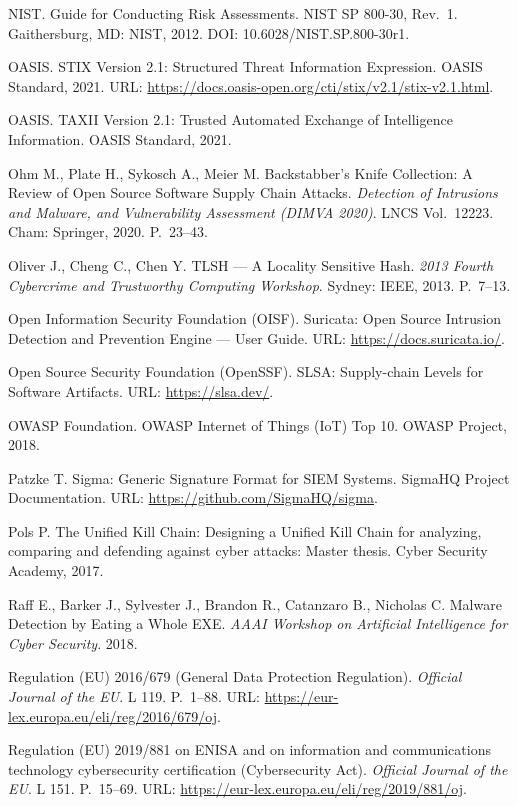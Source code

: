  NIST. Guide for Conducting Risk Assessments. NIST SP 800-30, Rev.~1. Gaithersburg, MD: NIST, 2012. DOI: 10.6028/NIST.SP.800-30r1.

 OASIS. STIX Version 2.1: Structured Threat Information Expression. OASIS Standard, 2021. URL: \url{https://docs.oasis-open.org/cti/stix/v2.1/stix-v2.1.html}.

 OASIS. TAXII Version 2.1: Trusted Automated Exchange of Intelligence Information. OASIS Standard, 2021.

 Ohm M., Plate H., Sykosch A., Meier M. Backstabber's Knife Collection: A Review of Open Source Software Supply Chain Attacks. \emph{Detection of Intrusions and Malware, and Vulnerability Assessment (DIMVA 2020)}. LNCS Vol.~12223. Cham: Springer, 2020. P.~23--43.

 Oliver J., Cheng C., Chen Y. TLSH --- A Locality Sensitive Hash. \emph{2013 Fourth Cybercrime and Trustworthy Computing Workshop}. Sydney: IEEE, 2013. P.~7--13.

 Open Information Security Foundation (OISF). Suricata: Open Source Intrusion Detection and Prevention Engine --- User Guide. URL: \url{https://docs.suricata.io/}.

 Open Source Security Foundation (OpenSSF). SLSA: Supply-chain Levels for Software Artifacts. URL: \url{https://slsa.dev/}.

 OWASP Foundation. OWASP Internet of Things (IoT) Top 10. OWASP Project, 2018.

 Patzke T. Sigma: Generic Signature Format for SIEM Systems. SigmaHQ Project Documentation. URL: \url{https://github.com/SigmaHQ/sigma}.

 Pols P. The Unified Kill Chain: Designing a Unified Kill Chain for analyzing, comparing and defending against cyber attacks: Master thesis. Cyber Security Academy, 2017.

 Raff E., Barker J., Sylvester J., Brandon R., Catanzaro B., Nicholas C. Malware Detection by Eating a Whole EXE. \emph{AAAI Workshop on Artificial Intelligence for Cyber Security}. 2018.

 Regulation (EU) 2016/679 (General Data Protection Regulation). \emph{Official Journal of the EU}. L 119. P.~1--88. URL: \url{https://eur-lex.europa.eu/eli/reg/2016/679/oj}.

 Regulation (EU) 2019/881 on ENISA and on information and communications technology cybersecurity certification (Cybersecurity Act). \emph{Official Journal of the EU}. L 151. P.~15--69. URL: \url{https://eur-lex.europa.eu/eli/reg/2019/881/oj}.

